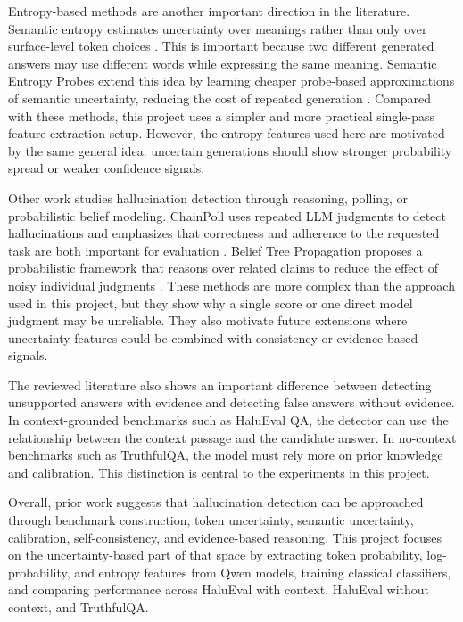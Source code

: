 \documentclass[11pt]{article}
\begin{document}
Entropy-based methods are another important direction in the literature. Semantic entropy estimates uncertainty over meanings rather than only over surface-level token choices \cite{farquhar2024semanticentropy}. This is important because two different generated answers may use different words while expressing the same meaning. Semantic Entropy Probes extend this idea by learning cheaper probe-based approximations of semantic uncertainty, reducing the cost of repeated generation \cite{kossen2024semanticprobes}. Compared with these methods, this project uses a simpler and more practical single-pass feature extraction setup. However, the entropy features used here are motivated by the same general idea: uncertain generations should show stronger probability spread or weaker confidence signals.

Other work studies hallucination detection through reasoning, polling, or probabilistic belief modeling. ChainPoll uses repeated LLM judgments to detect hallucinations and emphasizes that correctness and adherence to the requested task are both important for evaluation \cite{friel2023chainpoll}. Belief Tree Propagation proposes a probabilistic framework that reasons over related claims to reduce the effect of noisy individual judgments \cite{chen2025belief}. These methods are more complex than the approach used in this project, but they show why a single score or one direct model judgment may be unreliable. They also motivate future extensions where uncertainty features could be combined with consistency or evidence-based signals.

The reviewed literature also shows an important difference between detecting unsupported answers with evidence and detecting false answers without evidence. In context-grounded benchmarks such as HaluEval QA, the detector can use the relationship between the context passage and the candidate answer. In no-context benchmarks such as TruthfulQA, the model must rely more on prior knowledge and calibration. This distinction is central to the experiments in this project.

Overall, prior work suggests that hallucination detection can be approached through benchmark construction, token uncertainty, semantic uncertainty, calibration, self-consistency, and evidence-based reasoning. This project focuses on the uncertainty-based part of that space by extracting token probability, log-probability, and entropy features from Qwen models, training classical classifiers, and comparing performance across HaluEval with context, HaluEval without context, and TruthfulQA.
\end{document}
